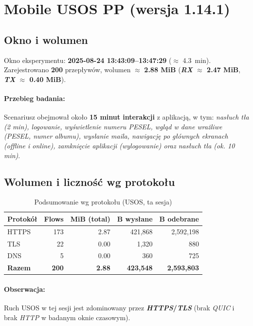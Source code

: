 \section{Mobile USOS PP (wersja 1.14.1)}
\label{sec:usos}

\subsection*{Okno i wolumen}
Okno eksperymentu: \textbf{2025-08-24 13{:}43{:}09–13{:}47{:}29} ($\approx$ \SI{4.3}{\minute}). 
Zarejestrowano \textbf{200} przepływów, wolumen $\approx$ \textbf{2.88 MiB} 
(\textbf{\emph{RX} $\approx$ 2.47 MiB}, \textbf{\emph{TX} $\approx$ 0.40 MiB}).

\paragraph{Przebieg badania:} 
Scenariusz obejmował około \textbf{15 minut interakcji} z aplikacją, w tym:
\emph{nasłuch tła (2 min), logowanie, wyświetlenie numeru PESEL, wgląd w dane wrażliwe (PESEL, numer albumu), wysłanie maila, nawigację po głównych ekranach (offline i online), zamknięcie aplikacji (wylogowanie) oraz nasłuch tła (ok. 10 min)}.

\subsection{Wolumen i liczność wg protokołu}
\begin{table}[H]
  \centering
  \caption{Podsumowanie wg protokołu (USOS, ta sesja)}
  \label{tab:usos-proto}
  \begin{tabular}{lrrrr}
    \toprule
    \textbf{Protokół} & \textbf{Flows} & \textbf{MiB (total)} & \textbf{B wysłane} & \textbf{B odebrane} \\
    \midrule
    HTTPS & 173 & 2.87 & 421{,}868 & 2{,}592{,}198 \\
    TLS   & 22  & 0.00 & 1{,}320   & 880 \\
    DNS   & 5   & 0.00 & 360       & 725 \\
    \midrule
    \textbf{Razem} & \textbf{200} & \textbf{2.88} & \textbf{423{,}548} & \textbf{2{,}593{,}803} \\
    \bottomrule
  \end{tabular}
\end{table}

\paragraph{Obserwacja:} 
Ruch USOS w tej sesji jest zdominowany przez \textbf{\emph{HTTPS}/\emph{TLS}} (brak \emph{QUIC} i brak \emph{HTTP} w badanym oknie czasowym).

